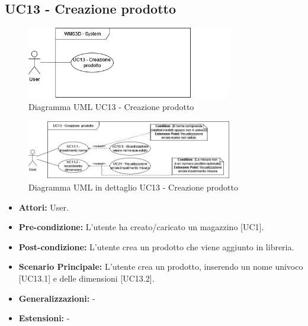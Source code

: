 \subsection{UC13 - Creazione prodotto}
\begin{figure}[H]
  \centering
  \includegraphics[width=0.8\textwidth]{UC_diagrams_11-20/UC13_sys.drawio.png}
   \caption{Diagramma UML UC13 - Creazione prodotto}
\end{figure}
\begin{figure}[H]
  \centering
  \includegraphics[width=0.8\textwidth]{UC_diagrams_11-20/UC13.drawio.png}
   \caption{Diagramma UML in dettaglio UC13 - Creazione prodotto}
\end{figure}
\begin{itemize}
    \item \textbf{Attori:} User.
    \item \textbf{Pre-condizione:}  L'utente ha creato/caricato un magazzino [UC1].
    \item \textbf{Post-condizione:} L'utente crea un prodotto che viene aggiunto in libreria.
    \item \textbf{Scenario Principale:}  L'utente crea un prodotto, inserendo un nome univoco [UC13.1] e delle dimensioni [UC13.2].
    \item \textbf{Generalizzazioni:} -
    \item \textbf{Estensioni:} -
\end{itemize}


